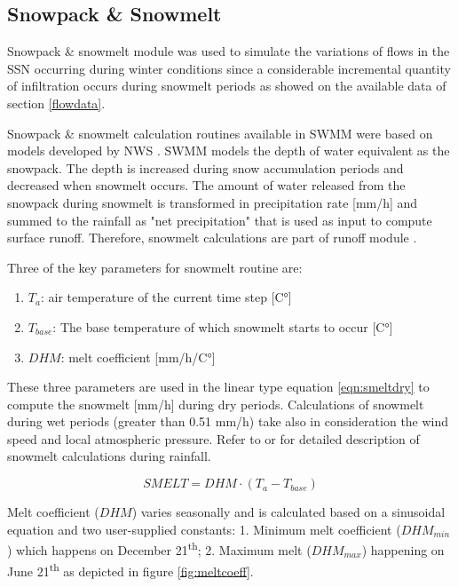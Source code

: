 \subsection{Snowpack \& Snowmelt} \label{snowlit}

Snowpack \& snowmelt module was used to simulate the variations of flows in the \acf{SSN} occurring during winter conditions since a considerable incremental quantity of infiltration occurs during snowmelt periods as showed on the available data of section \ref{flowdata}.

Snowpack \& snowmelt calculation routines available in SWMM were based on models developed by \acf{NWS} \cite{anderson1973,anderson2006}. SWMM models the depth of water equivalent as the snowpack. The depth is increased during snow accumulation periods and decreased when snowmelt occurs. The amount of water released from the snowpack during snowmelt is transformed in precipitation rate [mm/h] and summed to the rainfall as "net precipitation" that is used as input to compute surface runoff. Therefore, snowmelt calculations are part of runoff module \cite{Rossman2016}.

Three of the key parameters for snowmelt routine are:
\begin{enumerate}
    \item $T_a$: air temperature of the current time step [C°]
    \item $T_{base}$: The base temperature of which snowmelt starts to occur [C°]
    \item $DHM$: melt coefficient [mm/h/C°]
\end{enumerate}

These three parameters are used in the linear type equation \ref{eqn:smeltdry} to compute the snowmelt [mm/h] during dry periods. Calculations of snowmelt during wet periods (greater than 0.51 mm/h) take also in consideration the wind speed and local atmospheric pressure. Refer to \citet{anderson1973,anderson2006} or \citet{Rossman2016} for detailed description of snowmelt calculations during rainfall.

\begin{equation}
\label{eqn:smeltdry}
SMELT = DHM \cdot (T_a - T_{base}) 
\end{equation}

Melt coefficient ($DHM$) varies seasonally and is calculated based on a sinusoidal equation and two user-supplied constants: 1. Minimum melt coefficient ($DHM_{min}$) which happens on December 21\textsuperscript{th}; 2. Maximum melt ($DHM_{max}$) happening on June 21\textsuperscript{th} as depicted in figure \ref{fig:meltcoeff}. 

